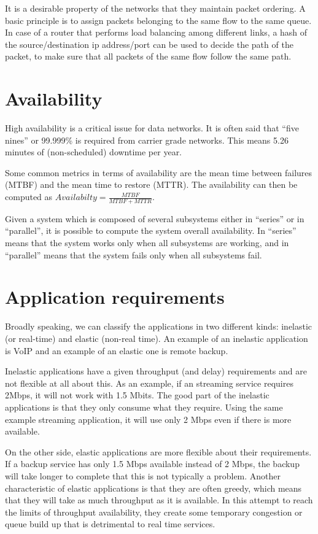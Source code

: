 It is a desirable property of the networks that they maintain packet ordering.
A basic principle is to assign packets belonging to the same flow to the same queue.
In case of a router that performs load balancing among different links, a hash of the source/destination ip address/port can be used to decide the path of the packet, to make sure that all packets of the same flow follow the same path.

\section{Availability}

High availability is a critical issue for data networks.
It is often said that ``five nines'' or 99.999\% is required from carrier grade networks.
This means 5.26 minutes of (non-scheduled) downtime per year.

Some common metrics in terms of availability are the mean time between failures (MTBF) and the mean time to restore (MTTR).
The availability can then be computed as $Availabilty = \frac{MTBF}{MTBF+MTTR}$.

Given a system which is composed of several subsystems either in ``series'' or in ``parallel'', it is possible to compute the system overall availability.
In ``series'' means that the system works only when all subsystems are working, and in ``parallel'' means that the system fails only when all subsystems fail.

\section{Application requirements}
Broadly speaking, we can classify the applications in two different kinds: inelastic (or real-time) and elastic (non-real time).
An example of an inelastic application is VoIP and an example of an elastic one is remote backup.

Inelastic applications have a given throughput (and delay) requirements and are not flexible at all about this.
As an example, if an streaming service requires 2Mbps, it will not work with 1.5 Mbits.
The good part of the inelastic applications is that they only consume what they require.
Using the same example streaming application, it will use only 2 Mbps even if there is more available.

On the other side, elastic applications are more flexible about their requirements.
If a backup service has only 1.5 Mbps available instead of 2 Mbps, the backup will take longer to complete that this is not typically a problem.
Another characteristic of elastic applications is that they are often greedy, which means that they will take as much throughput as it is available.
In this attempt to reach the limits of throughput availability, they create some temporary congestion or queue build up that is detrimental to real time services.

